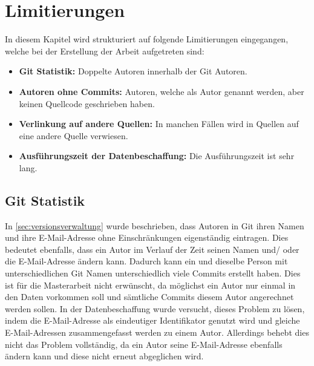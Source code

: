 \section{Limitierungen}
\label{sec:limitierungen}
In diesem Kapitel wird strukturiert auf folgende Limitierungen eingegangen, welche bei der Erstellung der Arbeit aufgetreten sind:
\begin{itemize}
    \item \textbf{Git Statistik:} Doppelte Autoren innerhalb der Git Autoren.
    \item \textbf{Autoren ohne Commits:} Autoren, welche als Autor genannt werden, aber keinen Quellcode geschrieben haben.
    \item \textbf{Verlinkung auf andere Quellen:} In manchen Fällen wird in Quellen auf eine andere Quelle verwiesen.
    \item \textbf{Ausführungszeit der Datenbeschaffung:} Die Ausführungszeit ist sehr lang.
\end{itemize}

\subsection*{Git Statistik}
\label{sec:git_statistik}
In \autoref{sec:versionsverwaltung} wurde beschrieben, dass Autoren in Git ihren Namen und ihre E-Mail-Adresse ohne Einschränkungen eigenständig eintragen.
Dies bedeutet ebenfalls, dass ein Autor im Verlauf der Zeit seinen Namen und/ oder die E-Mail-Adresse ändern kann.
Dadurch kann ein und dieselbe Person mit unterschiedlichen Git Namen unterschiedlich viele Commits erstellt haben.
Dies ist für die Masterarbeit nicht erwünscht, da möglichst ein Autor nur einmal in den Daten vorkommen soll und sämtliche Commits diesem Autor angerechnet werden sollen.
In der Datenbeschaffung wurde versucht, dieses Problem zu lösen, indem die E-Mail-Adresse als eindeutiger Identifikator genutzt wird und gleiche E-Mail-Adressen zusammengefasst werden zu einem Autor.
Allerdings behebt dies nicht das Problem vollständig, da ein Autor seine E-Mail-Adresse ebenfalls ändern kann und diese nicht erneut abgeglichen wird.

